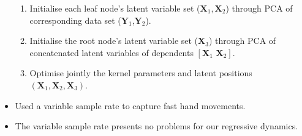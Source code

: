 \documentclass[english,color,smalltitle]{manchesterposter}
\begin{document}
\begin{multicols}{5}{\LARGE \par}
\begin{columnbox}
\begin{itemize}
\begin{enumerate}
\item Initialise each leaf node's latent variable set ($\mathbf{X}_{1},\mathbf{X}_{2}$)
through PCA of corresponding data set ($\mathbf{Y}_{1}$,$\mathbf{Y}_{2}$).{\large \par}
\item Initialise the root node's latent variable set ($\mathbf{X}_{3}$)
through PCA of concatenated latent variables of dependents $\left[\mathbf{X}_{1}\,\,\mathbf{X}_{2}\right]$.{\large \par}
\item Optimise jointly the kernel parameters and latent positions $\left(\mathbf{X}_{1},\mathbf{X}_{2},\mathbf{X}_{3}\right)$. {\large \par}
\end{enumerate}
\item Used a variable sample rate to capture fast hand movements.{\large \par}
\item The variable sample rate presents no problems for our regressive dynamics.{\large \par}
\end{itemize}
\end{columnbox}


\begin{columnbox}
\-



\end{columnbox}
\end{multicols}
\end{document}
